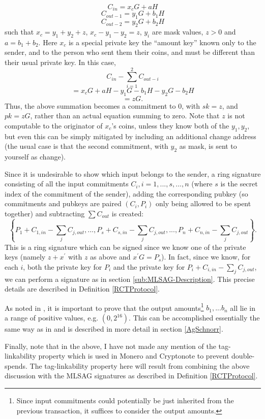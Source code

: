 \documentclass[12pt,english]{mrl}
\theoremstyle{definition}
\numberwithin{equation}{section}
\numberwithin{figure}{section}
\numberwithin{equation}{section}
\numberwithin{equation}{section}
\numberwithin{figure}{section}
\begin{document}
\[
C_{in}=x_{c}G+aH
\]
\[
C_{out-1}=y_{1}G+b_{1}H
\]
\[
C_{out-2}=y_{2}G+b_{2}H
\]
 such that $x_{c}=y_{1}+y_{2}+z$, $x_{c}-y_{1}-y_{2}=z$, $y_{i}$
are mask values, $z>0$ and $a=b_{1}+b_{2}.$ Here $x_{c}$ is a special
private key the ``amount key'' known only to the sender, and to
the person who sent them their coins, and must be different than their
usual private key. In this case, 
\[
C_{in}-\sum_{i=1}^{2}C_{out-i}
\]
\[
=x_{c}G+aH-y_{1}G-b_{1}H-y_{2}G-b_{2}H
\]
\[
=zG.
\]
Thus, the above summation becomes a commitment to $0$, with $sk=z$,
and $pk=zG$, rather than an actual equation summing to zero. Note
that $z$ is not computable to the originator of $x_{c}$'s coins,
unless they know both of the $y_{1},y_{2}$, but even this can be simply mitigated by including an additional change address (the usual case is that the second commitment, with $y_2$ as mask, is sent to yourself as change).  

Since it is undesirable to show which input belongs to the sender,
a ring signature consisting of all the input commitments $C_{i},i=1,...,s,...,n$
(where $s$ is the secret index of the commitment of the sender),
adding the corresponding pubkey (so commitments and pubkeys are paired
$\left(C_{i},P_{i}\right)$ only being allowed to be spent together)
and subtracting $\sum C_{out}$ is created: 
\[
\left\{ P_{1}+C_{1,in}-\sum_{j}C_{j,out},...,P_{s}+C_{s,in}-\sum_{j}C_{j,out},...,P_{n}+C_{n,in}-\sum_{j}C_{j,out}\right\} .
\]
 This is a ring signature which can be signed since we know one of
the private keys (namely $z+x^{\prime}$ with $z$ 
as above and $x^{\prime}G=P_{s}$). In fact, since we know, for each $i$, both the private key for $P_{i}$ and the private key for $P_{i}+C_{i,in}-\sum_{j}C_{j,out}$,
we can perform a signature as in section \ref{sub:MLSAG-Description}. This precise details are described in Definition \ref{RCTProtocol}.

As noted in \cite{GM}, it is important to prove that the output amounts\footnote{Since input commitments could potentially be just inherited from the
previous transaction, it suffices to consider the output amounts.}
$b_{1},...b_{n}$ all lie in a range of positive values, e.g. $(0,2^{16}).$
This can be accomplished essentially the same way as in \cite{GM} and is described in more detail in section \ref{AgSchnorr}.

Finally, note that in the above, I have not made any mention of the tag-linkability property which is used in Monero and Cryptonote to prevent double-spends. The tag-linkability property here will result from combining the above discussion with the MLSAG signatures as described in Definition \ref{RCTProtocol}.
\end{document}
